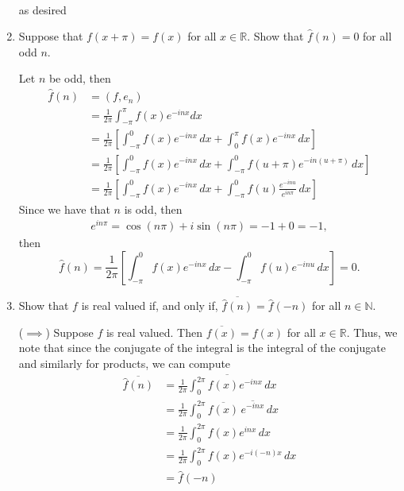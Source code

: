 \documentclass[11pt]{article}
\newcommand{\bbN}{\mathbb{N}}
\newcommand{\bbR}{\mathbb{R}}
\begin{document}
\begin{problem}
\begin{enumerate}
\begin{solution}
\begin{align*}
\end{align*}
as desired
\end{solution}
\item
Suppose that $f(x + \pi) = f(x)$ for all $x\in \bbR.$ Show that $\hat{f}(n) = 0$ for all odd $n.$
\begin{solution}
    Let $n$ be odd, then 
    \begin{align*}
        \hat{f}(n) &= (f,e_{n})\\
        &= \frac{1}{2\pi}\int_{-\pi}^{\pi} f(x)e^{-inx}dx\\
        &= \frac{1}{2\pi}\left[\int_{-\pi}^0 f(x)e^{-inx}\,dx + \int_0^{\pi} f(x)e^{-inx}\, dx\right]\\
        &= \frac{1}{2\pi}\left[\int_{-\pi}^0 f(x)e^{-inx}\,dx + \int_{-\pi}^{0} f(u+\pi)e^{-in(u + \pi)}\,dx\right]\\
        &= \frac{1}{2\pi}\left[\int_{-\pi}^0 f(x)e^{-inx}\,dx + \int_{-\pi}^{0} f(u)\frac{e^{-inu}}{e^{in\pi}}\,dx\right]
    \end{align*}
Since we have that $n$ is odd, then
\begin{align*}
    e^{in\pi} = \cos(n\pi) + i\sin(n\pi)
    = -1 + 0 = -1,
\end{align*}
then 
\[\hat{f}(n) = \frac{1}{2\pi}\left[\int_{-\pi}^0 f(x)e^{-inx}\,dx - \int_{-\pi}^{0} f(u)e^{-inu}\,dx\right] = 0.\]
\end{solution}
\item 
Show that $f$ is real valued if, and only if, $\overline{\hat{f}(n)} = \hat{f}(-n)$ for all $n \in \bbN.$
\begin{solution}
    ($\implies$) Suppose $f$ is real valued. Then $\overline{f(x)} = f(x)$ for all $x\in \bbR.$ Thus, we note that since the conjugate of the integral is the integral of the conjugate and similarly for products, we can compute
    \begin{align*}
        \overline{\hat{f}(n)} &= \overline{\frac{1}{2\pi}\int_0^{2\pi}f(x)e^{-inx}\,dx}\\
        &=  \frac{1}{2\pi}\int_0^{2\pi}\overline{f(x)}\,\overline{e^{-inx}}\,dx\\
        &= \frac{1}{2\pi}\int_0^{2\pi}f(x)e^{inx}\,dx\\
        &= \frac{1}{2\pi}\int_0^{2\pi}f(x)e^{-i(-n)x}\,dx\\
        &= \hat{f}(-n)
    \end{align*}


\end{solution}
\end{enumerate}
\end{problem}
\end{document}
